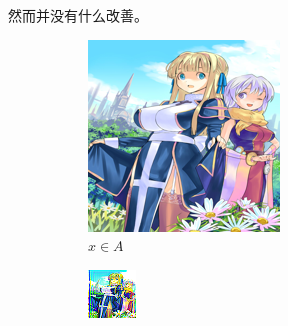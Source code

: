 \documentclass{beamer}
\begin{document}
\begin{frame}
    然而并没有什么改善。
\begin{figure}[htb]
    \centering
    \begin{subfigure}[b]{0.23\linewidth}
        \includegraphics[width=\linewidth]{exp7_epoch061_real_A.png}
        \caption{$x \in A$}
      \end{subfigure}
      \begin{subfigure}[b]{0.23\linewidth}
        \includegraphics[width=\linewidth]{exp7_epoch061_fake_B.png}

\end{subfigure}
\end{figure}
\end{frame}
\end{document}
